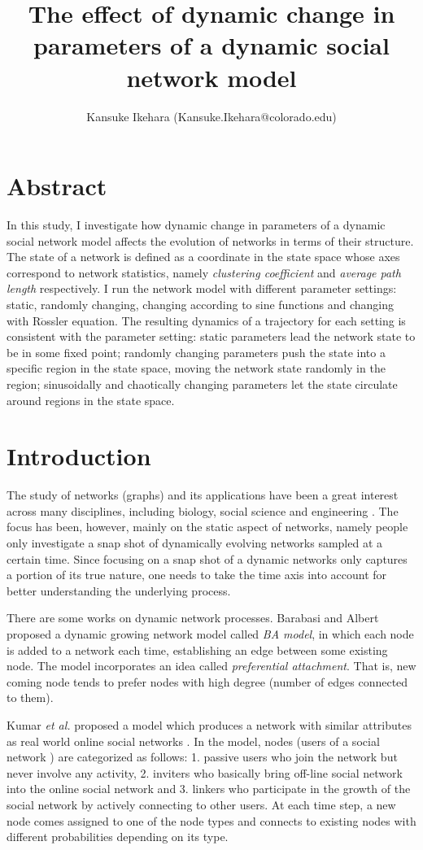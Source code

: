 \documentclass{article}
\title{The effect of dynamic change in parameters of a dynamic social network model }
\author{Kansuke Ikehara (Kansuke.Ikehara@colorado.edu)}
\begin{document}
\maketitle
\section*{Abstract}
In this study, I investigate how dynamic change in parameters of a dynamic social network model affects the evolution of networks in terms of their structure. The state of a network is defined as a coordinate in the state space whose axes correspond to network statistics, namely \textit{clustering coefficient} and \textit{average path length} respectively. I run the network model with different parameter settings: static, randomly changing, changing according to sine functions and changing with R$\ddot{\text{o}}$ssler equation. The resulting dynamics of a trajectory for each setting is consistent with the parameter setting: static parameters lead the network state to be in some fixed point; randomly changing parameters push the state into a specific region in the state space, moving the network state randomly in the region; sinusoidally and chaotically changing parameters let the state circulate around regions in the state space.

\section{Introduction}
The study of networks (graphs) and its applications have been a great interest across many disciplines, including biology, social science and engineering \cite{Newman:2010:NI:1809753}. The focus has been, however, mainly on the static aspect of networks, namely people only investigate a snap shot of dynamically evolving networks sampled at a certain time. Since focusing on a snap shot of a dynamic networks only captures a portion of its true nature, one needs to take the time axis into account for better understanding the underlying process.

There are some works on dynamic network processes. Barabasi and Albert proposed a dynamic growing network model called \textit{BA model}, in which each node is added to a network each time, establishing an edge between some existing node\cite{BA_Model}. The model incorporates an idea called \textit{preferential attachment}. That is, new coming node tends to prefer nodes with high degree (number of edges connected to them).

Kumar \textit{et al.} proposed a model which produces a network with similar attributes as real world online social networks \cite{Kumar:2006:SEO:1150402.1150476}. In the model, nodes (users of a social network ) are categorized as follows: 1. passive users who join the network but never involve any activity, 2. inviters who basically bring off-line social network into the online social network and 3. linkers who participate in the growth of the social network by actively connecting to other users. At each time step, a new node comes assigned to one of the node types and connects to existing nodes with different probabilities depending on its type.
\end{document}
